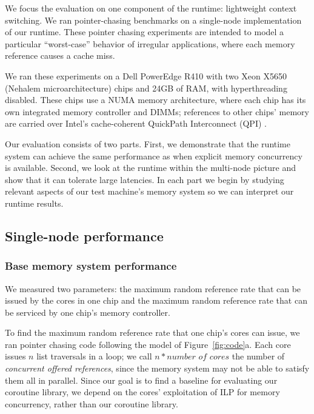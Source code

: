 \documentclass[10pt,nocopyrightspace,preprint]{sigplanconf}
\begin{document}
We focus the evaluation on one component of the runtime: lightweight context switching. We ran pointer-chasing benchmarks on a single-node implementation of our runtime. These pointer chasing experiments are intended to model a particular ``worst-case'' behavior of irregular applications, where each memory reference causes a cache miss.

We ran these experiments on a Dell PowerEdge R410 with two Xeon X5650 (Nehalem microarchitecture)
chips and 24GB of RAM, with hyperthreading disabled. These
chips use a NUMA memory architecture, where each chip has
its own integrated memory controller and DIMMs; references to other
chips' memory are carried over Intel's cache-coherent QuickPath
Interconnect (QPI) \cite{quickpath:website}.

Our evaluation consists of two parts. First, we demonstrate that the
runtime system can achieve the same performance as when 
explicit memory concurrency is available. Second, we look at the runtime
within the multi-node picture and show that it can tolerate large
latencies. In each part we begin by studying relevant aspects of our
test machine's memory system so we can interpret our runtime results.


\subsection{Single-node performance}


\subsubsection{Base memory system performance}
\label{subsubsec:evalsinglebase}

We measured two parameters: the maximum random reference
rate that can be issued by the cores in one chip and the maximum random
reference rate that can be serviced by one chip's memory controller. 

To find the maximum random reference rate that one chip's cores
can issue, we ran pointer chasing code following the model of
Figure~\ref{fig:code}a. Each core issues $n$ list traversals
in a loop; we call $n * \textit{number of cores}$ the number of
{\em concurrent offered references}, since the memory system may not
be able to satisfy them all in parallel. Since our goal is to find a
baseline for evaluating our coroutine library, we depend on the
cores' exploitation of ILP for memory concurrency, rather than our coroutine
library.
\end{document}
